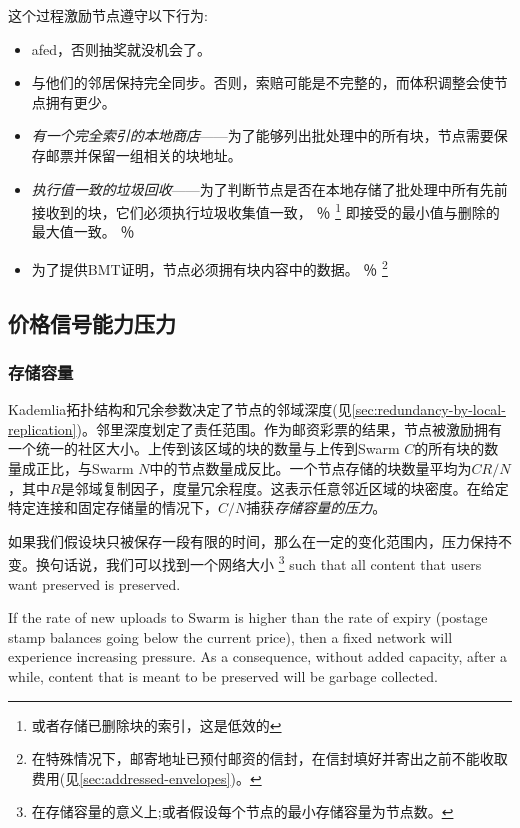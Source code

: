 这个过程激励节点遵守以下行为:

\begin{itemize}
\item afed，否则抽奖就没机会了。
\item 与他们的邻居保持完全同步。否则，索赔可能是不完整的，而体积调整会使节点拥有更少。
\item \emph{有一个完全索引的本地商店}——为了能够列出批处理中的所有块，节点需要保存邮票并保留一组相关的块地址。 
\item \emph{执行值一致的垃圾回收}——为了判断节点是否在本地存储了批处理中所有先前接收到的块，它们必须执行垃圾收集值一致，%
％
\footnote{或者存储已删除块的索引，这是低效的}
即接受的最小值与删除的最大值一致。
％
\item 为了提供BMT证明，节点必须拥有块内容中的数据。%
％
\footnote{在特殊情况下，邮寄地址已预付邮资的信封，在信封填好并寄出之前不能收取费用(见\ref{sec:addressed-envelopes})。}
\end{itemize}


\subsection{价格信号能力压力}\label{sec:capacity-pressure}

\yellow{}

\subsubsection{存储容量}
Kademlia拓扑结构和冗余参数决定了节点的邻域深度(见\ref{sec:redundancy-by-local-replication})。邻里深度划定了责任范围。作为邮资彩票的结果，节点被激励拥有一个统一的社区大小。上传到该区域的块的数量与上传到Swarm $C$的所有块的数量成正比，与Swarm $N$中的节点数量成反比。一个节点存储的块数量平均为$CR/N$，其中$R$是邻域复制因子，度量冗余程度。这表示任意邻近区域的块密度。在给定特定连接和固定存储量的情况下，$C/N$捕获\emph{存储容量的压力}。

如果我们假设块只被保存一段有限的时间，那么在一定的变化范围内，压力保持不变。换句话说，我们可以找到一个网络大小%
%
\footnote{在存储容量的意义上;或者假设每个节点的最小存储容量为节点数。}
%
such that all content that users want preserved is preserved. 

If the rate of new uploads to Swarm is higher than the rate of expiry (postage stamp balances going below the current price), then a fixed network will experience increasing pressure. As a consequence, without added capacity, after a while, content that is meant to be preserved will be garbage collected. 

